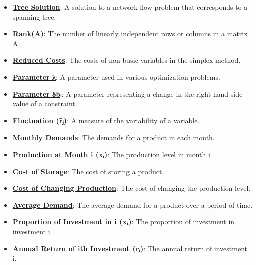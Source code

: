 \documentclass{article}%
\begin{document}
\begin{itemize}[leftmargin=*]
\item \href{https://www.math.purdue.edu/~yipn/421/2024-12-03-Duality.pdf#page=1}{\textbf{Tree Solution}}: A solution to a network flow problem that corresponds to a spanning tree. %
\item \href{https://www.math.purdue.edu/~yipn/421/2024-12-03-Duality.pdf#page=1}{\textbf{Rank(A)}}: The number of linearly independent rows or columns in a matrix A. %
\item \href{https://www.math.purdue.edu/~yipn/421/2024-12-03-Duality.pdf#page=1}{\textbf{Reduced Costs}}: The costs of non-basic variables in the simplex method. %
\item \href{https://www.math.purdue.edu/~yipn/421/2024-12-03-Duality.pdf#page=1}{\textbf{Parameter λ}}: A parameter used in various optimization problems. %
\item \href{https://www.math.purdue.edu/~yipn/421/2024-12-03-Duality.pdf#page=1}{\textbf{Parameter δbᵢ}}: A parameter representing a change in the right-hand side value of a constraint. %
\item \href{https://www.math.purdue.edu/~yipn/421/2024-12-03-Duality.pdf#page=1}{\textbf{Fluctuation (r̃ⱼ)}}: A measure of the variability of a variable. %
\item \href{https://www.math.purdue.edu/~yipn/421/2024-12-03-Duality.pdf#page=1}{\textbf{Monthly Demands}}: The demands for a product in each month. %
\item \href{https://www.math.purdue.edu/~yipn/421/2024-12-03-Duality.pdf#page=1}{\textbf{Production at Month i (xᵢ)}}: The production level in month i. %
\item \href{https://www.math.purdue.edu/~yipn/421/2024-12-03-Duality.pdf#page=1}{\textbf{Cost of Storage}}: The cost of storing a product. %
\item \href{https://www.math.purdue.edu/~yipn/421/2024-12-03-Duality.pdf#page=1}{\textbf{Cost of Changing Production}}: The cost of changing the production level. %
\item \href{https://www.math.purdue.edu/~yipn/421/2024-12-03-Duality.pdf#page=1}{\textbf{Average Demand}}: The average demand for a product over a period of time. %
\item \href{https://www.math.purdue.edu/~yipn/421/2024-12-03-Duality.pdf#page=1}{\textbf{Proportion of Investment in i (xᵢ)}}: The proportion of investment in investment i. %
\item \href{https://www.math.purdue.edu/~yipn/421/2024-12-03-Duality.pdf#page=1}{\textbf{Annual Return of ith Investment (rᵢ)}}: The annual return of investment i. %

\end{itemize}
\end{document}

